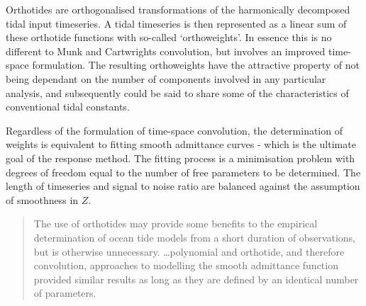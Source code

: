Orthotides are orthogonalised transformations of the harmonically decomposed tidal input timeseries.
A tidal timeseries is then represented as a linear sum of these orthotide functions with so-called `orthoweights'. In essence this is no different to Munk and Cartwrights convolution, but involves an improved time-space formulation.  
The resulting orthoweights have the attractive property of not being dependant on the number of components involved in any particular analysis, and subsequently could be said to share some of the characteristics of conventional tidal constants.

Regardless of the formulation of time-space convolution, the determination of weights is equivalent to fitting smooth admittance curves - which is the ultimate goal of the response method.  The fitting process is a minimisation problem with degrees of freedom equal to the number of free parameters to be determined.    The length of timeseries and signal to noise ratio are balanced against the assumption of smoothness in $Z$.
\begin{quotation}   
The use of orthotides may provide some benefits to the empirical determination of ocean tide models from a short duration of observations, but is otherwise unnecessary. \dots  polynomial and orthotide, and therefore convolution, approaches to modelling the smooth admittance function provided similar results as long as they are defined by an identical number of parameters.\citep{Desai:2006wo}
\end{quotation}
